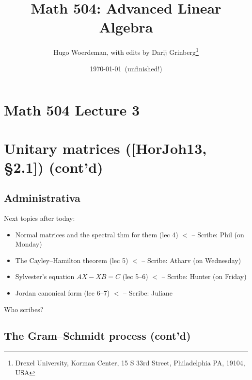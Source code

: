\documentclass[numbers=enddot,12pt,final,onecolumn,notitlepage]{scrartcl}%
\numberwithin{exer}{subsection}
\theoremstyle{definition}
\begin{document}
\title{Math 504: Advanced Linear Algebra}
\author{Hugo Woerdeman, with edits by Darij Grinberg\thanks{Drexel University, Korman
Center, 15 S 33rd Street, Philadelphia PA, 19104, USA}}
\date{\today\ (unfinished!)}
\maketitle
\tableofcontents

\section*{Math 504 Lecture 3}

\section{Unitary matrices ([HorJoh13, \S 2.1]) (cont'd)}

\subsection{Administrativa}

Next topics after today:

\begin{itemize}
\item Normal matrices and the spectral thm for them (lec 4)
$<$%
-- Scribe: Phil (on Monday)

\item The Cayley--Hamilton theorem (lec 5)
$<$%
-- Scribe: Atharv (on Wednesday)

\item Sylvester's equation $AX-XB=C$ (lec 5--6)
$<$%
-- Scribe: Hunter (on Friday)

\item Jordan canonical form (lec 6--7)
$<$%
-- Scribe: Juliane 
\end{itemize}

Who scribes?

\subsection{The Gram--Schmidt process (cont'd)}
\end{document}
